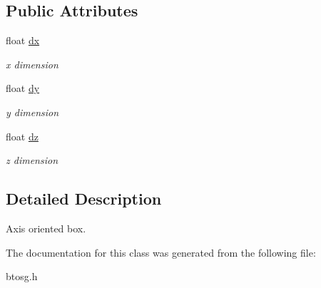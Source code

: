 \subsection*{Public Attributes}
\begin{DoxyCompactItemize}
\item 
\mbox{\label{classbtosgBox_a1d1e4744d9e377e1462ea097dacef716}} 
float \hyperlink{classbtosgBox_a1d1e4744d9e377e1462ea097dacef716}{dx}
\begin{DoxyCompactList}\small\item\em x dimension \end{DoxyCompactList}\item 
\mbox{\label{classbtosgBox_a7665337187adb52a1ce3b4cf2819217d}} 
float \hyperlink{classbtosgBox_a7665337187adb52a1ce3b4cf2819217d}{dy}
\begin{DoxyCompactList}\small\item\em y dimension \end{DoxyCompactList}\item 
\mbox{\label{classbtosgBox_a1dd905f6afb684d5d364f2b211dbab97}} 
float \hyperlink{classbtosgBox_a1dd905f6afb684d5d364f2b211dbab97}{dz}
\begin{DoxyCompactList}\small\item\em z dimension \end{DoxyCompactList}\end{DoxyCompactItemize}


\subsection{Detailed Description}
Axis oriented box. 

The documentation for this class was generated from the following file\+:\begin{DoxyCompactItemize}
\item 
btosg.\+h\end{DoxyCompactItemize}
